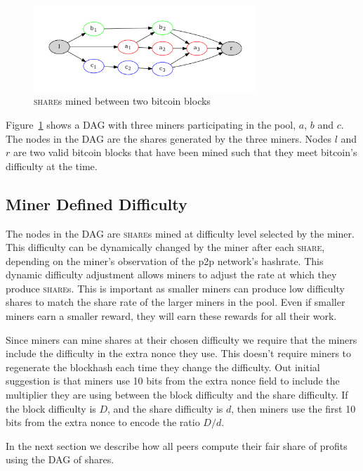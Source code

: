 \documentclass{article}
\begin{document}
\begin{figure}
  \begin{center}
    \includegraphics[width=0.75\textwidth]{dag}
    \caption{\textsc{share}s mined between two bitcoin blocks}\label{fig:dag}
  \end{center}
\end{figure}

Figure~\ref{fig:dag} shows a DAG with three miners participating
in the pool, $a$, $b$ and $c$. The nodes in the DAG are the shares
generated by the three miners. Nodes $l$ and $r$ are two valid bitcoin
blocks that have been mined such that they meet bitcoin's difficulty
at the time.

\subsection{Miner Defined Difficulty}\label{sec:share-difficulty}

The nodes in the DAG are \textsc{share}s mined at difficulty level
selected by the miner. This difficulty can be dynamically changed by
the miner after each \textsc{share}, depending on the miner's
observation of the p2p network's hashrate. This dynamic difficulty
adjustment allows miners to adjust the rate at which they produce
\textsc{share}s. This is important as smaller miners can produce low
difficulty shares to match the share rate of the larger miners in the
pool. Even if smaller miners earn a smaller reward, they will earn
these rewards for all their work.

Since miners can mine shares at their chosen difficulty we require
that the miners include the difficulty in the extra nonce they
use. This doesn't require miners to regenerate the blockhash each time
they change the difficulty. Out initial suggestion is that miners use
10 bits from the extra nonce field to include the multiplier they are
using between the block difficulty and the share difficulty. If the
block difficulty is $D$, and the share difficulty is $d$, then miners
use the first 10 bits from the extra nonce to encode the ratio $D/d$.

In the next section we describe how all peers compute their fair share
of profits using the DAG of shares.
  
\end{document}
